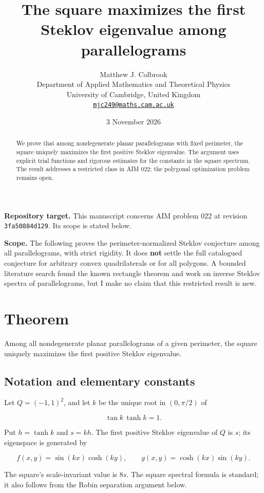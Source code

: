 \documentclass[11pt,a4paper]{article}
\title{\textbf{The square maximizes the first Steklov eigenvalue among parallelograms}}
\author{Matthew J. Colbrook\\[3pt]
{\small Department of Applied Mathematics and Theoretical Physics}\\
{\small University of Cambridge, United Kingdom}\\
{\small\href{mailto:mjc249@maths.cam.ac.uk}{\texttt{mjc249@maths.cam.ac.uk}}}}
\date{3 November 2026}
\begin{document}
\maketitle
\begin{abstract}
We prove that among nondegenerate planar parallelograms with fixed perimeter, the square uniquely maximizes the first positive Steklov eigenvalue. The argument uses explicit trial functions and rigorous estimates for the constants in the square spectrum. The result addresses a restricted class in AIM 022; the polygonal optimization problem remains open.
\end{abstract}
\noindent\textbf{Repository target.}
This manuscript concerns AIM problem 022 at revision
\texttt{3fa50884d129}. Its scope is stated below.
\medskip

\textbf{Scope.} The following proves the perimeter-normalized Steklov
conjecture among all parallelograms, with strict rigidity. It does
\textbf{not} settle the full catalogued conjecture for arbitrary convex
quadrilaterals or for all polygons. A bounded literature search found
the known rectangle theorem and work on inverse Steklov spectra of
parallelograms, but I make no claim that this restricted result is new.

\hypertarget{022-theorem}{%
\section{Theorem}\label{022-theorem}}

Among all nondegenerate planar parallelograms of a given perimeter, the
square uniquely maximizes the first positive Steklov eigenvalue.

\hypertarget{022-notation-and-elementary-constants}{%
\subsection{Notation and elementary
constants}\label{022-notation-and-elementary-constants}}

Let \(Q=(-1,1)^2\), and let \(k\) be the unique root in \((0,\pi /2)\) of

\[
\tan k\,\tanh k=1.
\]

Put \(h=\tanh k\) and \(s=k h\). The first positive Steklov eigenvalue
of \(Q\) is \(s\); its eigenspace is generated by

\[
f(x,y)=\sin(kx)\cosh(ky),\qquad
g(x,y)=\cosh(kx)\sin(ky).
\]

The square's scale-invariant value is \(8s\). The square spectral
formula is standard; it also follows from the Robin separation argument
below.
\end{document}
